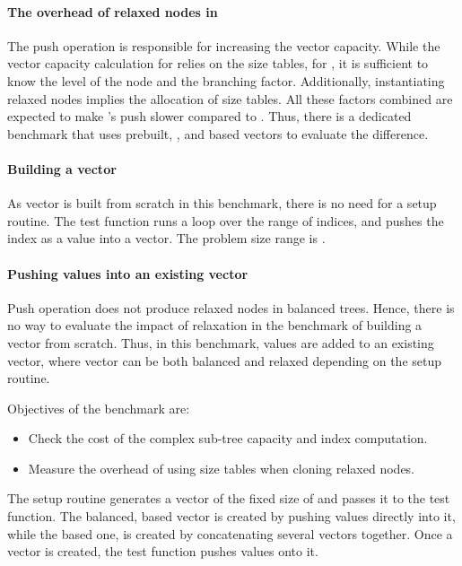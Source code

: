 \paragraph{The overhead of relaxed nodes in \rrbtree{}}
The push operation is responsible for increasing the vector capacity. While the vector capacity calculation for \rrbtree{} relies on the size tables, for \rbtree{}, it is sufficient to know the level of the node and the branching factor. Additionally, instantiating relaxed nodes implies the allocation of size tables. All these factors combined are expected to make \rrbtree{}'s push slower compared to \rbtree{}. Thus, there is a dedicated benchmark that uses prebuilt, \rrbtree{}, and \rbtree{} based vectors to evaluate the difference.

\paragraph{Building a vector}
As vector is built from scratch in this benchmark, there is no need for a setup routine. The test function runs a loop over the \range{[0, N)} range of indices, and pushes the index as a value into a vector. The problem size range is \range{[20, \mega{1}]}.

\paragraph{Pushing values into an existing vector}
Push operation does not produce relaxed nodes in balanced trees. Hence, there is no way to evaluate the impact of relaxation in the benchmark of building a vector from scratch. Thus, in this benchmark, values are added to an existing vector, where vector can be both balanced and relaxed depending on the setup routine.

Objectives of the benchmark are:
\begin{itemize}
    \item Check the cost of the complex sub-tree capacity and index computation.
    \item Measure the overhead of using size tables when cloning relaxed nodes.
\end{itemize}

The setup routine generates a vector of the fixed size of \n{} and passes it to the test function. The balanced, \rbtree{} based vector is created by pushing values directly into it, while the \rrbtree{} based one, is created by concatenating several vectors together. Once a vector is created, the test function pushes \n{} values onto it.

